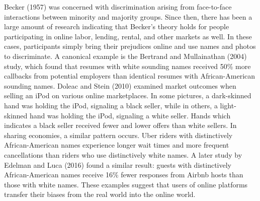 Becker (1957) was concerned with discrimination arising from face-to-face interactions between minority and majority groups. Since then, there has been a large amount of research indicating that Becker's theory holds for people participating in online labor, lending, rental, and other markets as well. In these cases, participants simply bring their prejudices online and use names and photos to discriminate. A canonical example is the Bertrand and Mullainathan (2004) study, which found that resumes with white sounding names received 50\% more callbacks from potential employers than identical resumes with African-American sounding names.\cite{bertrand} Doleac and Stein (2010) examined market outcomes when selling an iPod on various online marketplaces. In some pictures, a dark-skinned hand was holding the iPod, signaling a black seller, while in others, a light-skinned hand was holding the iPod, signaling a white seller.\cite{doleac} Hands which indicates a black seller received fewer and lower offers than white sellers. In sharing economies, a similar pattern occurs. Uber riders with distinctively African-American names experience longer wait times and more frequent cancellations than riders who use distinctively white names.\cite{knittel} A later study by Edelman and Luca (2016) found a similar result: guests with distinctively African-American names receive 16\% fewer responses from Airbnb hosts than those with white names.\cite{edelman2} These examples suggest that users of online platforms transfer their biases from the real world into the online world.  

